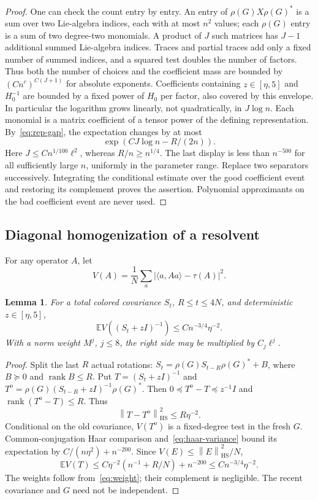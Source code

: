 \documentclass[11pt]{article}
\newtheorem{lemma}[theorem]{Lemma}
\theoremstyle{definition}\newtheorem{definition}[theorem]{Definition}
\theoremstyle{remark}\newtheorem{remark}[theorem]{Remark}
\DeclareMathOperator{\rank}{rank}
\newcommand{\E}{\mathbb E}
\newcommand{\HS}{\mathrm{HS}}
\newcommand{\ip}[2]{\langle#1,#2\rangle}
\newcommand{\norm}[1]{\left\lVert#1\right\rVert}
\begin{document}
\begin{proof}
One can check the count entry by entry. An entry of $\rho(G)X\rho(G)^*$ is a sum over two Lie-algebra indices, each with at most $n^2$ values; each $\rho(G)$ entry is a sum of two degree-two monomials. A product of $J$ such matrices has $J-1$ additional summed Lie-algebra indices. Traces and partial traces add only a fixed number of summed indices, and a squared test doubles the number of factors. Thus both the number of choices and the coefficient mass are bounded by $(C n^c)^{C(J+1)}$ for absolute exponents. Coefficients containing $z\in[\eta,5]$ and $H_0^{-1}$ are bounded by a fixed power of $H_0$ per factor, also covered by this envelope. In particular the logarithm grows linearly, not quadratically, in $J\log n$.
 Each monomial is a matrix coefficient of a tensor power of the defining representation. By~\eqref{eq:rep-gap}, the expectation changes by at most
\[
 \exp(CJ\log n-R/(2n)).
\]
Here $J\le C n^{1/100}\ell^2$, whereas $R/n\ge n^{1/4}$. The last display is less than $n^{-500}$ for all sufficiently large $n$, uniformly in the parameter range. Replace two separators successively. Integrating the conditional estimate over the good coefficient event and restoring its complement proves the assertion. Polynomial approximants on the bad coefficient event are never used.
\end{proof}

\subsection{Diagonal homogenization of a resolvent}
For any operator $A$, let
\[
 V(A)=\frac1N\sum_a|\ip a{Aa}-\tau(A)|^2.
\]
\begin{lemma}\label{lem:diag-resolvent}
For a total colored covariance $S_t$, $R\le t\le4N$, and deterministic $z\in[\eta,5]$,
\begin{equation}\label{eq:diag-resolvent}
 \E V((S_t+zI)^{-1})\le C n^{-3/4}\eta^{-2}.
\end{equation}
With a norm weight $M^j$, $j\le8$, the right side may be multiplied by $C_j\ell^j$.
\end{lemma}
\begin{proof}
Split the last $R$ actual rotations:
$S_t=\rho(G)S_{t-R}\rho(G)^*+B$, where $B\succeq0$ and $\rank B\le R$.
Put $T=(S_t+zI)^{-1}$ and
$T^{\mathrm o}=\rho(G)(S_{t-R}+zI)^{-1}\rho(G)^*$.
Then $0\preceq T^{\mathrm o}-T\preceq z^{-1}I$ and $\rank(T^{\mathrm o}-T)\le R$. Thus
\[
 \norm{T-T^{\mathrm o}}_{\HS}^2\le R\eta^{-2}.
\]
Conditional on the old covariance, $V(T^{\mathrm o})$ is a fixed-degree test in the fresh $G$. Common-conjugation Haar comparison and~\eqref{eq:haar-variance} bound its expectation by $C/(n\eta^2)+n^{-200}$. Since $V(E)\le\norm E_{\HS}^2/N$,
\[
 \E V(T)\le C\eta^{-2}(n^{-1}+R/N)+n^{-200}
 \le C n^{-3/4}\eta^{-2}.
\]
The weights follow from~\eqref{eq:weight}; their complement is negligible. The recent covariance and $G$ need not be independent.
\end{proof}
\end{document}
